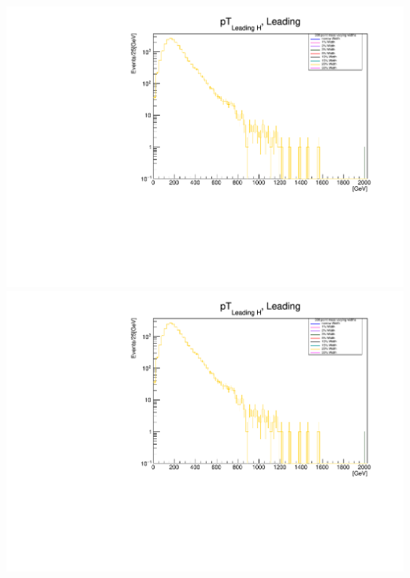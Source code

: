 \documentclass[a4wide,10pt]{article}
\begin{document}
\includegraphics[scale=0.50,page=13]{../Pdfs/Leading_Higgs_TransverseMomentum_VaryingWidths.pdf}
\includegraphics[scale=0.50,page=14]{../Pdfs/Leading_Higgs_TransverseMomentum_VaryingWidths.pdf}
\end{document}
